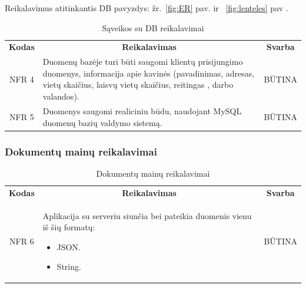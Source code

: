 \documentclass{VUMIFPSkursinis}
\begin{document}
Reikalavimus atitinkantis DB pavyzdys: žr.~\ref{fig:ER} pav. ir ~\ref{fig:lenteles} pav .
\begin{center}
	\begin{table}[H]
	\caption{Sąveikos su DB reikalavimai}
	\begin{tabular}{|p{2cm}|p{}|p{}|}
	\hline
	    \rowcolor{lightgray}
		\multicolumn{3}{|c|}{Sąveikos su DB reikalavimai}\\
		
	\hline
		\multicolumn{1}{|c|}{{\bfseries Kodas}}&
		\multicolumn{1}{|c|}{{\bfseries Reikalavimas}}&
		\multicolumn{1}{|c|}{{\bfseries Svarba}}\\
	\hline 	
		\multicolumn{1}{|c|}{NFR 4}&
		{Duomenų bazėje turi būti saugomi klientų prisijungimo duomenys, informacija apie kavinės (pavadinimas, adresas, vietų skaičius, laisvų vietų skaičius, reitingas , darbo valandos).}&
		\multicolumn{1}{|c|}{BŪTINA}\\	
	
	\hline 	
		\multicolumn{1}{|c|}{NFR 5}&
		{Duomenys saugomi realiciniu būdu, naudojant MySQL duomenų bazių valdymo sistemą.}&
		\multicolumn{1}{|c|}{BŪTINA}\\	
	
	\hline  	 	
	\end{tabular}
	
	\label{table:SąveikossuDBreikalavimai}
	\end{table}

\end{center}

\subsubsection{Dokumentų mainų reikalavimai}

\begin{center}
	\begin{table}[H]
	\caption{Dokumentų mainų reikalavimai}
	\begin{tabular}{|p{2cm}|p{}|p{}|}
	\hline
	    \rowcolor{lightgray}
		\multicolumn{3}{|c|}{Dokumentų mainų reikalavimai}\\
		
	\hline
		\multicolumn{1}{|c|}{{\bfseries Kodas}}&
		\multicolumn{1}{|c|}{{\bfseries Reikalavimas}}&
		\multicolumn{1}{|c|}{{\bfseries Svarba}}\\
	\hline 	
		\multicolumn{1}{|c|}{NFR 6}&
		{Aplikacija su serveriu siunčia bei pateikia duomenis vienu iš šių formatų:
			\begin{itemize}
			\item JSON.
			\item String.
			\end{itemize}}&
		\multicolumn{1}{|c|}{BŪTINA}\\	
	
	\hline 	 	 	
	\end{tabular}
	
	\label{table:Dokumentųmainųreikalavimai}
	\end{table}

\end{center}
\end{document}

